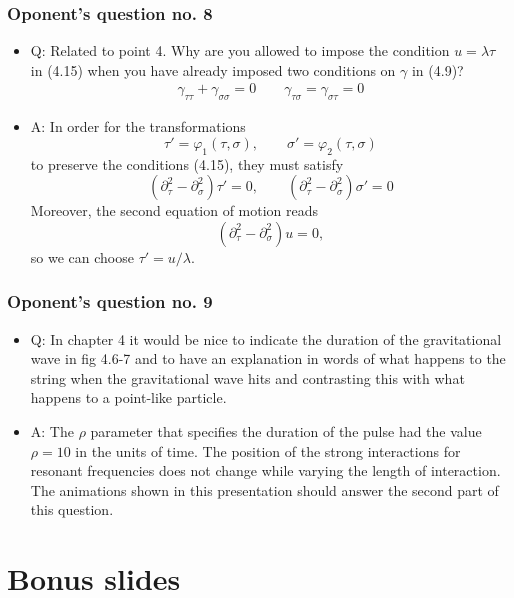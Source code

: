 \documentclass[11pt]{beamer}
\newcommand{\difs}[3][]{\partial_{#3}^{#1}{#2}}
\begin{document}
\begin{frame}
\frametitle{Oponent's question no. 8}
\begin{itemize}
	\item Q: Related to point 4. Why are you allowed to impose the condition $u = \lambda \tau$ in (4.15) when you have already imposed two conditions on $\gamma$ in (4.9)?
	\begin{equation} \tag{4.15}
	\begin{aligned}
	\gamma_{\tau \tau} + \gamma_{\sigma \sigma} = 0 \qquad 
	\gamma_{\tau \sigma} = \gamma_{\sigma \tau} = 0 
	\end{aligned}
	\end{equation}
	\item A: In order for the transformations
	$$
	\tau' = \varphi_1(\tau, \sigma), \qquad \sigma' = \varphi_2(\tau, \sigma)
	$$
	to preserve the conditions (4.15), they must satisfy
	$$
	(\difs[2]{}{\tau} - \difs[2]{}{\sigma}) \tau' = 0, \qquad (\difs[2]{}{\tau} - \difs[2]{}{\sigma}) \sigma' = 0
	$$
	Moreover, the second equation of motion reads
	$$
	(\difs[2]{}{\tau} - \difs[2]{}{\sigma}) u = 0,
	$$
	so we can choose $\tau' = u/\lambda$.
\end{itemize}
\end{frame}



\begin{frame}
\frametitle{Oponent's question no. 9}
\begin{itemize}
	\item Q: In chapter 4 it would be nice to indicate the duration of the gravitational wave in
	fig 4.6-7 and to have an explanation in words of what happens to the string when
	the gravitational wave hits and contrasting this with what happens to a point-like
	particle.
	\item A: The $\rho$ parameter that specifies the duration of the pulse had the value $\rho = 10$ in the units of time. The position of the strong interactions for resonant frequencies does not change while varying the length of interaction.
	The animations shown in this presentation should answer the second part of this question. 
\end{itemize}
\end{frame}


\section{Bonus slides}
\end{document}
